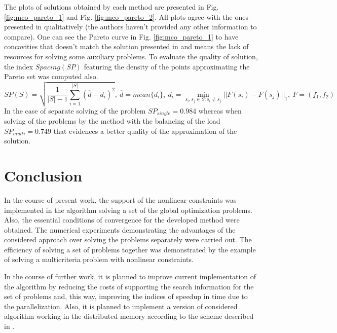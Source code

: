 \documentclass[runningheads]{llncs}
\begin{document}
The plots of solutions obtained by each method are presented in Fig. \ref{fig:mco_pareto_1}
and Fig. \ref{fig:mco_pareto_2}.
All plots agree with the ones presented in \cite{BinhKorn1999} qualitatively (the authors
haven't provided any other information to compare).
One can see the Pareto curve in Fig. \ref{fig:mco_pareto_1} to have concavities that doesn't
match the solution presented in \cite{BinhKorn1999} and means the lack of resources for
solving some auxiliary problems.
To evaluate the quality of solution, the index \(Spacing(SP)\) \cite{RiquelmeLucken2015}
featuring the density of the points approximating the Pareto set was computed also.
\begin{displaymath}
  SP(S)=\sqrt{\frac{1}{|S|-1} \sum_{i=1}^{|S|} (\overline{d}-d_i)^2},
  \:\overline{d}=mean\{d_i\},\:d_i=\min_{s_i,s_j\in S:s_i\ne s_j}||F(s_i)-F(s_j)||_1,\: F=(f_1,f_2)
\end{displaymath}
In the case of separate solving of the problem \(SP_{single}=0.984\) whereas when solving of
the problems by the method with the balancing of the load \(SP_{multi}=0.749\) that evidences
a better quality of the approximation of the solution.

\section{Conclusion}

In the course of present work, the support of the nonlinear constraints was implemented in the
algorithm solving a set of the global optimization problems.
Also, the essential conditions of convergence for the developed method were obtained.
The numerical experiments demonstrating the advantages of the considered approach over
solving the problems separately were carried out.
The efficiency of solving a set of problems together was demonstrated by the example of
solving a multicriteria problem with nonlinear constraints.

In the course of further work, it is planned to improve current implementation of the algorithm
by reducing the costs of supporting the search information for the set of problems and, this way,
improving the indices of speedup in time due to the parallelization.
Also, it is planned to implement a version of considered algorithm working in the distributed
memory according to the scheme described in \cite{BarkalovLebedev2017_2}.

%
%
%


%
\end{document}
